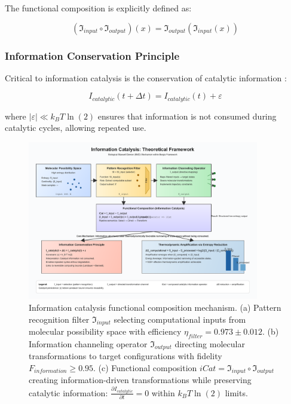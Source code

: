 \documentclass[12pt,a4paper]{article}
\begin{document}
The functional composition is explicitly defined as:

\begin{equation}
(\mathfrak{I}_{input} \circ \mathfrak{I}_{output})(x) = \mathfrak{I}_{output}(\mathfrak{I}_{input}(x))
\end{equation}

\subsubsection{Information Conservation Principle}

Critical to information catalysis is the conservation of catalytic information \cite{bennett1982thermodynamics}:

\begin{equation}
I_{catalytic}(t + \Delta t) = I_{catalytic}(t) + \varepsilon
\end{equation}

where $|\varepsilon| \ll k_B T \ln(2)$ ensures that information is not consumed during catalytic cycles, allowing repeated use.

\begin{figure}[H]
    \centering
    \includegraphics[width=0.9\textwidth]{images/information-catalysis.pdf}
    \caption{Information catalysis functional composition mechanism. (a) Pattern recognition filter $\mathfrak{I}_{input}$ selecting computational inputs from molecular possibility space with efficiency $\eta_{filter} = 0.973 \pm 0.012$. (b) Information channeling operator $\mathfrak{I}_{output}$ directing molecular transformations to target configurations with fidelity $F_{information} \ge 0.95$. (c) Functional composition $iCat = \mathfrak{I}_{input} \circ \mathfrak{I}_{output}$ creating information-driven transformations while preserving catalytic information: $\frac{\partial I_{catalytic}}{\partial t} = 0$ within $k_B T \ln(2)$ limits.}
    \label{fig:information_catalysis}
\end{figure}
\end{document}
